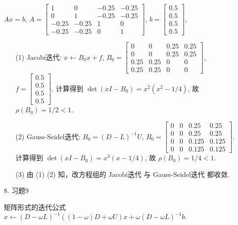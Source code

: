\documentclass{article}
\begin{document}
\begin{spacing}{1.5}
\begin{itemize}
    $Ax = b$, $A = \left[\begin{array}{cccc}
        1 &    0 & -0.25 & -0.25 \\    0 &    1 & -0.25 & -0.25 \\ -0.25 & -0.25 &    1 &    0 \\ -0.25 & -0.25 &    0 &    1
    \end{array}\right]$, $b = \left[\begin{array}{c}
        0.5 \\  0.5 \\  0.5 \\  0.5
    \end{array}\right]$, 
    \begin{itemize}
        \item [(1)]  Jacobi迭代: $x\leftarrow B_0x + f$, 
        $B_0 = \left[\begin{array}{cccc}
            0 &    0 & 0.25 & 0.25 \\    0 &    0 & 0.25 & 0.25 \\ 0.25 & 0.25 &    0 &    0 \\ 0.25 & 0.25 &    0 &    0
        \end{array}\right]$, $f = \left[\begin{array}{c}
            0.5 \\  0.5 \\  0.5 \\  0.5
        \end{array}\right]$. 计算得到 $\det(xI - B_0) = x^2(x^2-1/4)$, 故 $\rho(B_0) = 1/2 < 1$.
        \item [(2)] Gauss-Seidel迭代: $B_0 = (D - L)^{-1} U$, $B_0 = \left[\begin{array}{cccc}
            0 &    0 & 0.25 & 0.25 \\    0 &    0 & 0.25 & 0.25 \\    0 &    0 & 0.125 & 0.125 \\    0 &    0 & 0.125 & 0.125
        \end{array}\right]$. 计算得到 $\det(xI - B_0) = x^3(x-1/4)$, 故 $\rho(B_0) = 1/4 < 1$.
        \item [(3)] 由 (1) (2) 知，改方程组的 Jacobi迭代 与 Gauss-Seidel迭代 都收敛.
    \end{itemize}

    \item [8.] 习题9
    
    矩阵形式的迭代公式 $x \leftarrow (D-\omega L)^{-1}((1-\omega)D + \omega U)x + \omega(D-\omega L)^{-1}b$.


\end{itemize}
\end{spacing}
\end{document}

